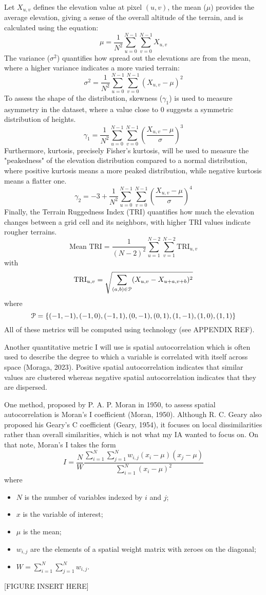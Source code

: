 Let $X_{u,v}$ defines the elevation value at pixel $(u,v)$, the mean ($\mu$) provides the average elevation, giving a sense of the overall altitude of the 
terrain, and is calculated using the equation:
\[\mu=\frac{1}{N^2}\sum_{u=0}^{N-1}\sum_{v=0}^{N-1}X_{u,v}\]
The variance ($\sigma^2$) quantifies how spread out the elevations are from the mean, where a higher variance indicates a more varied terrain:
\[\sigma^2=\frac{1}{N^2}\sum_{u=0}^{N-1}\sum_{v=0}^{N-1}{(X_{u,v}-\mu)}^2\]
To assess the shape of the distribution, skewness ($\gamma_1$) is used to measure asymmetry in the dataset, where a value close to 0 suggests a symmetric 
distribution of heights. 
\[\gamma_1=\frac{1}{N^2}\sum_{u=0}^{N-1}\sum_{v=0}^{N-1}{\left(\frac{X_{u,v}-\mu}{\sigma}\right)}^3\]
Furthermore, kurtosis, precisely Fisher's kurtosis, will be used to measure the "peakedness" of the elevation distribution compared to a normal distribution, where positive kurtosis 
means a more peaked distribution, while negative kurtosis means a flatter one.
\[\gamma_2=-3+\frac{1}{N^2}\sum_{u=0}^{N-1}\sum_{v=0}^{N-1}{\left(\frac{X_{u,v}-\mu}{\sigma}\right)}^4\]
Finally, the Terrain Ruggedness Index (TRI) quantifies how much the elevation changes between a grid cell and its neighbors, with higher TRI values indicate 
rougher terrains.
\[\text{Mean TRI}=\frac{1}{(N-2)^2}\sum_{u=1}^{N-2}\sum_{v=1}^{N-2}\text{TRI}_{u,v}\]
with 
\[\text{TRI}_{u,v}=\sqrt{\sum_{(a,b)\in \EuScript{P}}(X_{u,v}-{X_{u+a,v+b}})^2}\]
where
\[\EuScript{P}=\{(-1,-1),(-1,0),(-1,1),(0,-1),(0,1),(1,-1),(1,0),(1,1)\}\]
All of these metrics will be computed using technology (see APPENDIX REF).

Another quantitative metric I will use is spatial autocorrelation which is often used to describe the degree to which a variable is correlated with itself 
across space (Moraga, 2023). Positive spatial autocorrelation indicates that similar values are clustered whereas negative spatial autocorrelation indicates 
that they are dispersed. 

One method, proposed by P. A. P. Moran in 1950, to assess spatial autocorrelation is Moran's I coefficient (Moran, 1950). Although R. C. Geary also proposed 
his Geary's C coefficient (Geary, 1954), it focuses on local dissimilarities rather than overall similarities, which is not what my IA wanted to focus on. 
On that note, Moran's I takes the form
\[I=\frac{N}{W}\frac{\sum_{i=1}^{N}\sum_{j=1}^{N}w_{i,j}(x_i-\mu)(x_j-\mu)}{\sum_{i=1}^{N}{(x_i-\mu)}^2}\]
where
\begin{itemize}
    \item $N$ is the number of variables indexed by $i$ and $j$;
    \item $x$ is the variable of interest;
    \item $\mu$ is the mean;
    \item $w_{i,j}$ are the elements of a spatial weight matrix with zeroes on the diagonal;
    \item $W=\sum_{i=1}^{N}\sum_{j=1}^{N}w_{i,j}$.
\end{itemize}
[FIGURE INSERT HERE]

